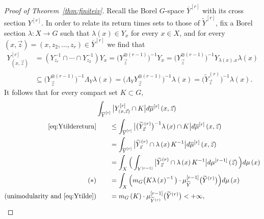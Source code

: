 \documentclass[10pt,a4paper]{amsart}
\begin{document}
\begin{proof}[Proof of Theorem~\ref{thm:finiteiv}]
Recall the Borel \(G\)-space \(\overline{Y}^{\left[r\right]}\) with its cross section \(Y^{\left[r\right]}\). In order to relate its return times sets to those of \(\widetilde{Y}^{\left[r\right]}\), fix a Borel section \(\lambda:X\to G\) such that \(\lambda\left(x\right)\in Y_{x}\) for every \(x\in X\), and for every \(\left(x,\vec{z}\right)=\left(x,z_{2},\dotsc,z_{r}\right)\in\overline{Y}^{\left[r\right]}\) we find that
\begin{equation}\label{eq:Ytildereturn}
\begin{aligned}
Y_{\left(x,\vec{z}\right)}^{\left[r\right]}	
&=\left(Y_{z_{r}}^{-1}\cap\dotsm\cap Y_{z_{2}}^{-1}\right)Y_{x}=\big(Y_{\vec{z}}^{\otimes\left(r-1\right)}\big)^{-1}Y_{x}=\big(Y_{\vec{z}}^{\otimes\left(r-1\right)}\big)^{-1}Y_{\lambda\left(x\right).x}\lambda\left(x\right)\\
&\subseteq\big(Y_{\vec{z}}^{\otimes\left(r-1\right)}\big)^{-1}\Lambda_{Y}\lambda\left(x\right)=\big(\Lambda_{Y}Y_{\vec{z}}^{\otimes\left(r-1\right)}\big)^{-1}\lambda\left(x\right)=\big(\widetilde{Y}_{\vec{z}}^{\left(r\right)}\big)^{-1}\lambda\left(x\right).
\end{aligned}
\end{equation}
It follows that for every compact set \(K\subset G\),
\begin{align*}
&\int_{\overline{Y}^{\left[r\right]}}\big|Y_{\left(x,\vec{z}\right)}^{\left[r\right]}\cap K\big|d\overline{\mu}^{\left[r\right]}\left(x,\vec{z}\right)\\
\eqref{eq:Ytildereturn}&\qquad \leq\int_{\overline{Y}^{\left[r\right]}}\big|\big(\widetilde{Y}_{\vec{z}}^{\left(r\right)}\big)^{-1}\lambda\left(x\right)\cap K\big|d\overline{\mu}^{\left[r\right]}\left(x,\vec{z}\right)\\
&\qquad=\int_{\overline{Y}^{\left[r\right]}}\big|\widetilde{Y}_{\vec{z}}^{\left(r\right)}\cap\lambda\left(x\right)K^{-1}\big|d\overline{\mu}^{\left[r\right]}\left(x,\vec{z}\right)\\
&\qquad=\int_{X}\Big(\int_{Y^{\left[r-1\right]}}\big|\widetilde{Y}_{\vec{z}}^{\left(r\right)}\cap\lambda\left(x\right)K^{-1}\big|d\mu^{\left[r-1\right]}\left(\vec{z}\right)\Big)d\mu\left(x\right)\\
\left(\ast\right)&\qquad=\int_{X}\Big(m_{G}\big(K\lambda\left(x\right)^{-1}\big)\cdot\mu_{\widetilde{Y}}^{\left[r-1\right]}\big(\widetilde{Y}^{\left(r\right)}\big)\Big)d\mu\left(x\right)\\
\text{(unimodularity and }\eqref{eq:Ytilde})&\qquad=m_{G}\left(K\right)\cdot\mu_{\widetilde{Y}^{\left(r\right)}}^{\left[r-1\right]}\big(\widetilde{Y}^{\left(r\right)}\big)<+\infty,

\end{align*}
\end{proof}
\end{document}
